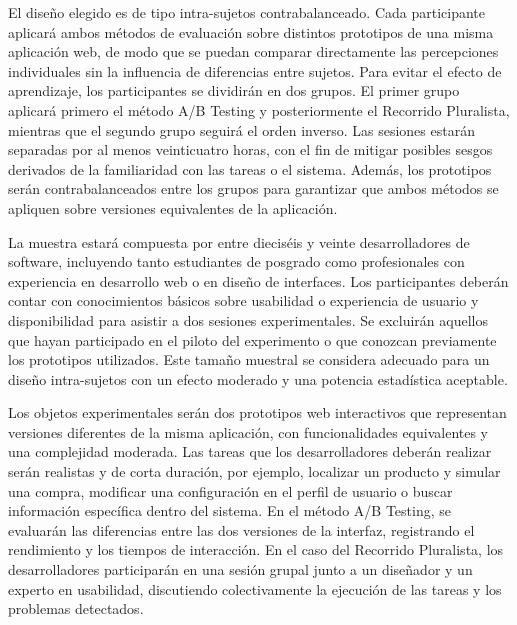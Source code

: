 \documentclass[a4paper,12pt]{report}
\begin{document}
El diseño elegido es de tipo intra-sujetos contrabalanceado. Cada participante aplicará ambos métodos de evaluación sobre distintos prototipos de una misma aplicación web, de modo que se puedan comparar directamente las percepciones individuales sin la influencia de diferencias entre sujetos. Para evitar el efecto de aprendizaje, los participantes se dividirán en dos grupos. El primer grupo aplicará primero el método A/B Testing y posteriormente el Recorrido Pluralista, mientras que el segundo grupo seguirá el orden inverso. Las sesiones estarán separadas por al menos veinticuatro horas, con el fin de mitigar posibles sesgos derivados de la familiaridad con las tareas o el sistema. Además, los prototipos serán contrabalanceados entre los grupos para garantizar que ambos métodos se apliquen sobre versiones equivalentes de la aplicación.

La muestra estará compuesta por entre dieciséis y veinte desarrolladores de software, incluyendo tanto estudiantes de posgrado como profesionales con experiencia en desarrollo web o en diseño de interfaces. Los participantes deberán contar con conocimientos básicos sobre usabilidad o experiencia de usuario y disponibilidad para asistir a dos sesiones experimentales. Se excluirán aquellos que hayan participado en el piloto del experimento o que conozcan previamente los prototipos utilizados. Este tamaño muestral se considera adecuado para un diseño intra-sujetos con un efecto moderado y una potencia estadística aceptable.

Los objetos experimentales serán dos prototipos web interactivos que representan versiones diferentes de la misma aplicación, con funcionalidades equivalentes y una complejidad moderada. Las tareas que los desarrolladores deberán realizar serán realistas y de corta duración, por ejemplo, localizar un producto y simular una compra, modificar una configuración en el perfil de usuario o buscar información específica dentro del sistema. En el método A/B Testing, se evaluarán las diferencias entre las dos versiones de la interfaz, registrando el rendimiento y los tiempos de interacción. En el caso del Recorrido Pluralista, los desarrolladores participarán en una sesión grupal junto a un diseñador y un experto en usabilidad, discutiendo colectivamente la ejecución de las tareas y los problemas detectados.
\end{document}
